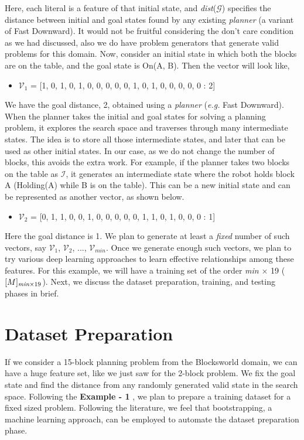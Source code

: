 \documentclass[]{article}
\begin{document}
\begin{itemize}
%
Here, each literal is a feature of that initial state, and \emph{dist}($\mathcal{G}$) specifies the distance between initial and goal states found by any existing \emph{planner} (a variant of Fast Downward). 
It would not be fruitful considering the don't care condition as we had discussed, also we do have problem generators that generate valid problems for this domain.
% 
Now, consider an initial state in which both the blocks are on the table, and the goal state is On(A, B).  Then the vector will look like,
\begin{itemize}
	\item[] $\mathcal{V}_1$ = [1, 0, 1, 0, 1, 0, 0, 0, 0, 0, 1, 0, 1, 0, 0, 0, 0, 0 : 2] 
\end{itemize}
%
We have the goal distance, 2, obtained using a \emph{planner} (\emph{e.g.} Fast Downward). 
When the planner takes the initial and goal states for solving a planning problem, it explores the search space and traverses through many intermediate states.
The idea is to store all those intermediate states, and later that can be used as other initial states. In our case, as we do not change the number of blocks, this avoids the extra work. 
For example, if the planner takes two blocks on the table as $\mathcal{I}$, it generates an intermediate state where the robot holds  block A (Holding(A) while B is on the table). 
This can be a new initial state and can be represented as another vector, as shown below.
\begin{itemize}
	\item[] $\mathcal{V}_2$ = [0, 1, 1, 0, 0, 1, 0, 0, 0, 0, 0, 1, 1, 0, 1, 0, 0, 0 : 1] 
\end{itemize}
Here the goal distance is 1. We plan to generate at least a \emph{fixed} number of such vectors, say $\mathcal{V}_{1}$, $\mathcal{V}_{2}$, ..., $\mathcal{V}_{min}$.
Once we generate enough such vectors, we plan to try various deep learning approaches to learn effective relationships among these features.
For this example, we will have a training set of the order \emph{min} $\times$ 19 ($[M]_{\emph{min}  \times 19}$). Next, we discuss the dataset preparation, training, and testing phases in brief.
%
\end{itemize}
%
%
\section{Dataset Preparation}
If we consider a 15-block planning problem from the Blocksworld domain, we can have a huge feature set, like we just saw for the 2-block problem. 
We fix the goal state and find the distance from any randomly generated valid state in the search space.
Following the \textbf{Example - 1 }, we plan to prepare  a training dataset for a fixed sized problem. 
Following the literature,
we feel that bootstrapping, a machine learning approach, can be employed to automate the dataset preparation phase. 
\end{document}
